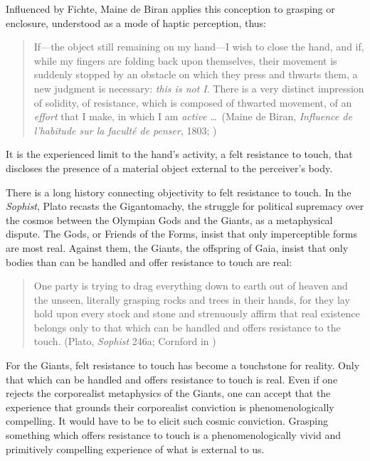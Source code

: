 Influenced by Fichte, Maine de Biran applies this conception to grasping or enclosure, understood as a mode of haptic perception, thus:
\begin{quote}
	If---the object still remaining on my hand---I wish to close the hand, and if, while my fingers are folding back upon themselves, their movement is suddenly stopped by an obstacle on which they press and thwarts them, a new judgment is necessary: \emph{this is not I}. There is a very distinct impression of solidity, of resistance, which is composed of thwarted movement, of an \emph{effort} that I make, in which I am \emph{active} \ldots\ (Maine de Biran, \emph{Influence de l'habitude sur la facult\'{e} de penser}, 1803; \citealt[57]{Boehm:1929aa})
\end{quote}
It is the experienced limit to the hand's activity, a felt resistance to touch, that discloses the presence of a material object external to the perceiver's body.

There is a long history connecting objectivity to felt resistance to touch. In the \emph{Sophist}, Plato recasts the Gigantomachy, the struggle for political supremacy over the cosmos between the Olympian Gods and the Giants, as a metaphysical dispute. The Gods, or Friends of the Forms, insist that only imperceptible forms are most real. Against them, the Giants, the offspring of Gaia, insist that only bodies than can be handled and offer resistance to touch are real:
\begin{quote}
	One party is trying to drag everything down to earth out of heaven and the unseen, literally grasping rocks and trees in their hands, for they lay hold upon every stock and stone and strenuously affirm that real existence belongs only to that which can be handled and offers resistance to the touch. (Plato, \emph{Sophist} 246a; Cornford in \citealt[990]{Hamilton:1989fk})
\end{quote}
For the Giants, felt resistance to touch has become a touchstone for reality. Only that which can be handled and offers resistance to touch is real. Even if one rejects the corporealist metaphysics of the Giants, one can accept that the experience that grounds their corporealist conviction is phenomenologically compelling. It would have to be to elicit such cosmic conviction. Grasping something which offers resistance to touch is a phenomenologically vivid and primitively compelling experience of what is external to us. 

